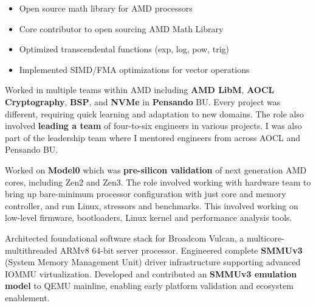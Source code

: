 \documentclass[12pt,a4paper]{pawesome-cv}
\begin{document}
\begin{cventries}
\begin{opensourcecontent}
\begin{itemize}
\item Open source math library for AMD processors
\item Core contributor to open sourcing AMD Math Library
\item Optimized transcendental functions (exp, log, pow, trig)
\item Implemented SIMD/FMA optimizations for vector operations
\end{itemize}
\end{opensourcecontent}
\end{cventries}
\label{sec:org076d44f}

\begin{cventries}
\begin{experiencecontent}
Worked in multiple teams within AMD including \textbf{AMD LibM}, \textbf{AOCL Cryptography}, \textbf{BSP}, and \textbf{NVMe} in \textbf{Pensando} BU.
Every project was different, requiring quick learning and adaptation to new domains. The role also involved \textbf{leading a team} of four-to-six
engineers in various projects. I was also part of the leadership team where I mentored engineers from across AOCL and Pensando BU.\end{experiencecontent}
\begin{experiencecontent}
Worked on \textbf{Model0} which was \textbf{pre-silicon validation} of next generation AMD cores, including Zen2 and Zen3. The role involved working with
hardware team to bring up bare-minimum processor configuration with just core and memory controller, and run Linux, stressors and benchmarks.
This involved working on low-level firmware, bootloaders, Linux kernel and performance analysis tools.\end{experiencecontent}
\begin{experiencecontent}
Architected foundational software stack for Broadcom Vulcan, a multicore-multithreaded ARMv8 64-bit server processor.
Engineered complete \textbf{SMMUv3} (System Memory Management Unit) driver infrastructure supporting advanced IOMMU virtualization.
Developed and contributed an \textbf{SMMUv3 emulation model} to QEMU mainline, enabling early platform validation and ecosystem enablement.

\end{experiencecontent}
\end{cventries}
\end{document}
